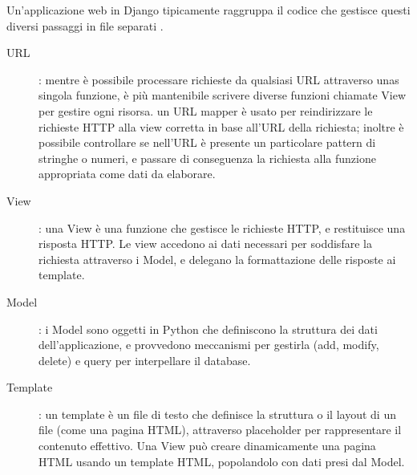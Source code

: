 \hfill \break
Un'applicazione web in Django tipicamente raggruppa il codice che gestisce questi diversi passaggi in file separati \cite{mdn-django-documentation}.
\begin{description}
    \item[URL]: mentre è possibile processare richieste da qualsiasi URL attraverso unas singola funzione, è più mantenibile scrivere diverse funzioni chiamate
    View per gestire ogni risorsa. un URL mapper è usato per reindirizzare le richieste HTTP alla view corretta in base all'URL della richiesta; inoltre è 
    possibile controllare se nell'URL è presente un particolare pattern di stringhe o numeri, e passare di conseguenza la richiesta alla funzione appropriata
    come dati da elaborare.
    \item[View]: una View è una funzione che gestisce le richieste HTTP, e restituisce una risposta HTTP. Le view accedono ai dati necessari per soddisfare la 
    richiesta attraverso i Model, e delegano la formattazione delle risposte ai template. 
    \item[Model]: i Model sono oggetti in Python che definiscono la struttura dei dati dell'applicazione, e provvedono meccanismi per gestirla (add, modify, 
    delete) e query per interpellare il database.
    \item[Template]: un template è un file di testo che definisce la struttura o il layout di un file (come una pagina HTML), attraverso placeholder per
    rappresentare il contenuto effettivo. Una View può creare dinamicamente una pagina HTML usando un template HTML, popolandolo con dati presi dal Model.
\end{description}
%
